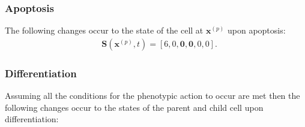 \documentclass[\main/thesis.tex]{subfiles}
\begin{document}
\subsubsection{Apoptosis}
The following changes occur to the state of the cell at $\boldsymbol{x}^{(p)}$ upon apoptosis:
\begin{align}
&\boldsymbol{S}(\boldsymbol{x}^{(p)}, t) {=} [ 6, 0, \boldsymbol{0}, \boldsymbol{0}, 0, 0 ].
\label{eq:ApoptosisStateChange}
\end{align}

\subsubsection{Differentiation}
Assuming all the conditions for the phenotypic action to occur are met then the  
following changes occur to the states of the parent and child cell upon differentiation:
\end{document}
